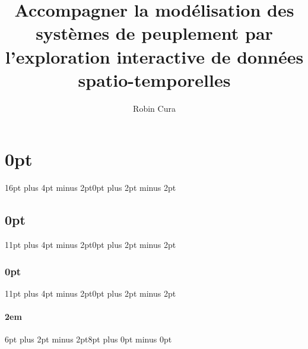 \titlespacing\section{0pt}{16pt plus 4pt minus 2pt}{0pt plus 2pt minus 2pt}
\titlespacing\subsection{0pt}{11pt plus 4pt minus 2pt}{0pt plus 2pt minus 2pt}
\titlespacing\subsubsection{0pt}{11pt plus 4pt minus 2pt}{0pt plus 2pt minus 2pt}
\titlespacing\paragraph{2em}{6pt plus 2pt minus 2pt}{8pt plus 0pt minus 0pt}
\newcommand{\sectionbreak}{\clearpage} %



\usepackage{pbox}
\usepackage{array}%



\usepackage{multicol}


\usepackage[bottom]{footmisc}
\newcommand{\astfootnote}[1]{
	\let\oldthefootnote=\thefootnote
	\setcounter{footnote}{0}
	\renewcommand{\thefootnote}{\fnsymbol{footnote}}
	\hspace*{-.45cm}\footnote{#1}\unskip
	\let\thefootnote=\oldthefootnote
}



\usepackage{afterpage}
\newcommand\blankpage{%
	\null
	\thispagestyle{empty}%
	\addtocounter{page}{-1}%
	\newpage}

\usepackage{titling}
\title{Accompagner la modélisation des systèmes de peuplement par l’exploration interactive de données spatio-temporelles}
\author{Robin Cura}
\date{\vspace{-5ex}}
\makeatletter
\newcommand*{\toccontents}{\@starttoc{toc}}
\makeatother

\usepackage{blindtext}

\newcommand{\simfeodal}{\textsc{SimFeodal}}
\newcommand{\simedb}{\textsc{SimEDB}}


\emergencystretch=1cm


\usepackage[toc,title]{appendix}
\renewcommand{\appendixtocname}{Annexes}
\renewcommand{\appendixpagename}{Annexes} 

\usepackage{pdfpages}